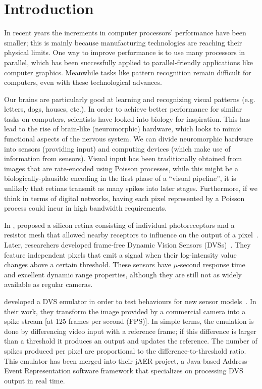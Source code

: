 \documentclass[conference]{IEEEtran}
\begin{document}
\section{Introduction}

In recent years the increments in computer processors' performance have been smaller; this is mainly because manufacturing technologies are reaching their physical limits. One way to improve performance is to use many processors in parallel, which has been successfully applied to parallel-friendly applications like computer graphics. Meanwhile tasks like pattern recognition remain difficult for computers, even with these technological advances.

Our brains are particularly good at learning and recognizing visual patterns (e.g. letters, dogs, houses, etc.). In order to achieve better performance for similar tasks on computers, scientists have looked into biology for inspiration. This has lead to the rise of brain-like (neuromorphic) hardware, which looks to mimic functional aspects of the nervous system. We can divide neuromorphic hardware into sensors (providing input) and computing devices (which make use of information from sensors). Visual input has been traditionally obtained from images that are rate-encoded using Poisson processes, while this might be a biologically-plausible encoding in the first phase of a ``visual pipeline'', it is unlikely that retinas transmit as many spikes into later stages. Furthermore, if we think in terms of digital networks, having each pixel represented by a Poisson process could incur in high bandwidth requirements. 

In \citeyear{Mead1989}, \citeauthor{Mead1989} proposed a silicon retina consisting of individual photoreceptors and a resistor mesh that allowed nearby receptors to influence on the output of a pixel~\cite{Mead1989}. 
Later, researchers developed frame-free Dynamic Vision Sensors (DVSs)~\cite{delbruckDVS,bernabeDVS}. They feature independent pixels that emit a signal when their log-intensity value changes above a certain threshold. These sensors have $\mu$-second response time and excellent dynamic range properties, although they are still not as widely available as regular cameras.

\citeauthor{DVSemu} developed a DVS emulator in order to test behaviours for new sensor models~\cite{DVSemu}. In their work, they transform the image provided by a commercial camera into a spike stream [at 125 frames per second (FPS)]. In simple terms, the emulation is done by differencing video input with a reference frame; if this difference is larger than a threshold it produces an output and updates the reference. The number of spikes produced per pixel are proportional to the difference-to-threshold ratio. This emulator has been merged into their jAER project, a Java-based Address-Event Representation software framework that specializes on processing DVS output in real time.
\end{document}
